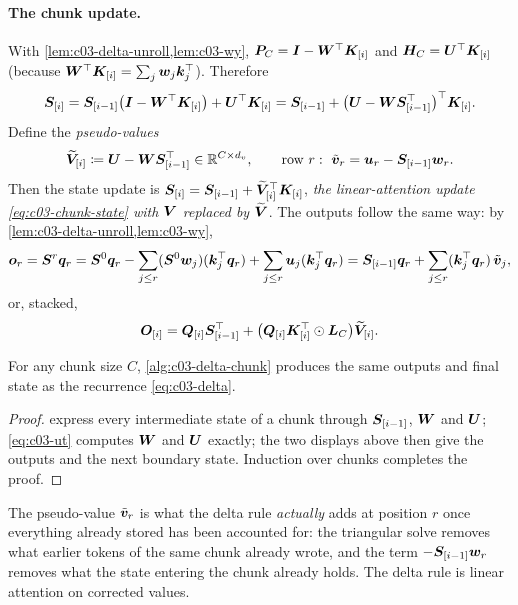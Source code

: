 \paragraph{The chunk update.}
With \cref{lem:c03-delta-unroll,lem:c03-wy}, $\bm{P}_C=\bm{I}-\bm{W}^{\top}\bm{K}_{[i]}$ and
$\bm{H}_C=\bm{U}^{\top}\bm{K}_{[i]}$ (because $\bm{W}^{\top}\bm{K}_{[i]}=\sum_j\bm{w}_j\bm{k}_j^{\top}$). Therefore
\[
  \bm{S}_{[i]}=\bm{S}_{[i-1]}\big(\bm{I}-\bm{W}^{\top}\bm{K}_{[i]}\big)+\bm{U}^{\top}\bm{K}_{[i]}
  =\bm{S}_{[i-1]}+\big(\bm{U}-\bm{W}\bm{S}_{[i-1]}^{\top}\big)^{\top}\bm{K}_{[i]} .
\]
Define the \emph{pseudo-values}
\begin{equation}\label{eq:c03-pseudo}
  \widetilde{\bm{V}}_{[i]}\coloneqq\bm{U}-\bm{W}\bm{S}_{[i-1]}^{\top}\in\mathbb{R}^{C\times d_v},
  \qquad\text{row } r:\ \tilde{\bm{v}}_r=\bm{u}_r-\bm{S}_{[i-1]}\bm{w}_r .
\end{equation}
Then the state update is $\bm{S}_{[i]}=\bm{S}_{[i-1]}+\widetilde{\bm{V}}_{[i]}^{\top}\bm{K}_{[i]}$, \emph{the
linear-attention update \cref{eq:c03-chunk-state} with $\bm{V}$ replaced by $\widetilde{\bm{V}}$}. The
outputs follow the same way: by \cref{lem:c03-delta-unroll,lem:c03-wy},
\[
  \bm{o}_r=\bm{S}^{r}\bm{q}_r=\bm{S}^0\bm{q}_r-\sum_{j\le r}(\bm{S}^0\bm{w}_j)(\bm{k}_j^{\top}\bm{q}_r)+\sum_{j\le r}\bm{u}_j(\bm{k}_j^{\top}\bm{q}_r)
  =\bm{S}_{[i-1]}\bm{q}_r+\sum_{j\le r}(\bm{k}_j^{\top}\bm{q}_r)\,\tilde{\bm{v}}_j ,
\]
or, stacked,
\begin{equation}\label{eq:c03-delta-chunk-out}
  \bm{O}_{[i]}=\bm{Q}_{[i]}\bm{S}_{[i-1]}^{\top}+\big(\bm{Q}_{[i]}\bm{K}_{[i]}^{\top}\odot\bm{L}_C\big)\widetilde{\bm{V}}_{[i]} .
\end{equation}

\begin{theorem}\label{thm:c03-delta-chunk}
For any chunk size $C$, \cref{alg:c03-delta-chunk} produces the same outputs and final state as
the recurrence \cref{eq:c03-delta}.
\end{theorem}

\begin{proof}
 express every intermediate state of a chunk through
$\bm{S}_{[i-1]}$, $\bm{W}$ and $\bm{U}$; \cref{eq:c03-ut} computes $\bm{W}$ and $\bm{U}$ exactly; the two
displays above then give the outputs and the next boundary state. Induction over chunks
completes the proof.
\end{proof}

The pseudo-value $\tilde{\bm{v}}_r$ is what the delta rule \emph{actually} adds at position $r$ once
everything already stored has been accounted for: the triangular solve removes what earlier
tokens of the same chunk already wrote, and the term $-\bm{S}_{[i-1]}\bm{w}_r$ removes what the state
entering the chunk already holds. The delta rule is linear attention on corrected values.


